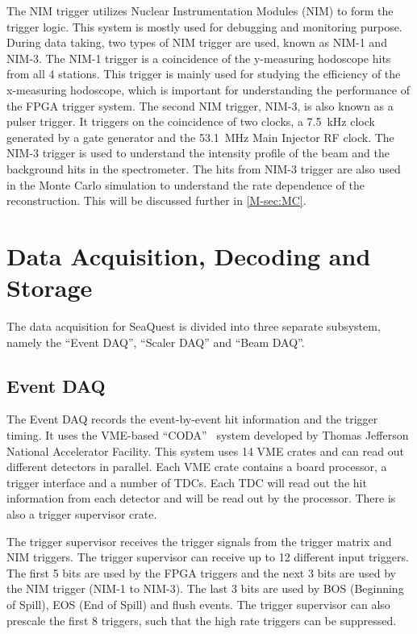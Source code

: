 \documentclass[../main.tex]{subfiles}
\begin{document}
The NIM trigger utilizes Nuclear Instrumentation Modules (NIM) to form the trigger
logic. This system is mostly used for debugging and monitoring purpose.
During data taking, two types of NIM trigger are used, known as NIM-1
and NIM-3. The NIM-1 trigger is a coincidence of the y-measuring hodoscope hits
from all 4 stations. This trigger is mainly used for studying the efficiency
of the x-measuring hodoscope, which is important for understanding the performance
of the FPGA trigger system. The second NIM trigger, NIM-3, is also known as a
pulser trigger. It triggers on the coincidence of two clocks, a \SI{7.5}{\kHz}
clock generated by a gate generator and the \SI{53.1}{\MHz} Main Injector
RF clock. The NIM-3 trigger is used to understand the intensity profile of the
beam and the background hits in the spectrometer. The hits from NIM-3 trigger
are also used in the Monte Carlo simulation to understand the rate dependence
of the reconstruction. This will be discussed further in \cref{M-sec:MC}.

\section{Data Acquisition, Decoding and Storage}
The data acquisition for SeaQuest is divided into three separate subsystem, namely
the ``Event DAQ'', ``Scaler DAQ'' and ``Beam DAQ''.

\subsection{Event DAQ}
The Event DAQ records the event-by-event hit information and the trigger timing.
It uses the VME-based ``CODA''~\cite{CODA} system developed by Thomas Jefferson National Accelerator
Facility. This system uses 14 VME crates and can read out different detectors in parallel.
Each VME crate contains a board processor, a trigger interface and a number of TDCs.
Each TDC will read out the hit information from each detector and will be read out by the processor.
There is also a trigger supervisor crate.

The trigger supervisor receives the trigger signals from the trigger matrix and NIM triggers. The trigger supervisor
can receive up to 12 different input triggers. The first 5 bits are used by the FPGA triggers
and the next 3 bits are used by the NIM trigger (NIM-1 to NIM-3). The last 3 bits
are used by BOS (Beginning of Spill), EOS (End of Spill) and flush events.
The trigger supervisor can also prescale the first 8 triggers, such that the high rate triggers can be suppressed.
\end{document}
